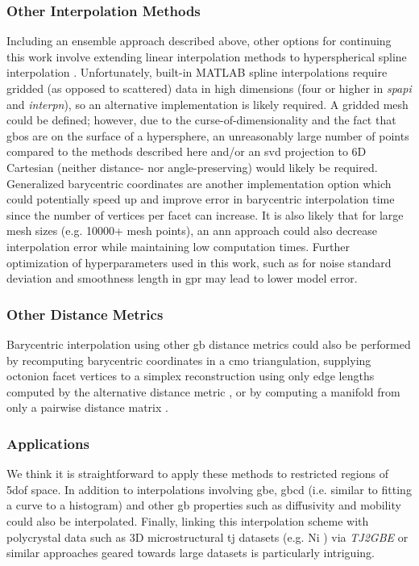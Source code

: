 \documentclass[preprint,12pt]{elsarticle}
\begin{document}
\subsubsection{Other Interpolation Methods}
Including an ensemble approach described above, other options for continuing this work involve extending linear interpolation methods to hyperspherical spline interpolation \cite{taijeronSplineInterpolationSmoothing1994}. Unfortunately, built-in MATLAB spline interpolations require gridded (as opposed to scattered) data in high dimensions (four or higher in \textit{spapi} and \textit{interpn}), so an alternative implementation is likely required. A gridded mesh could be defined; however, due to the curse-of-dimensionality and the fact that \glspl{gbo} are on the surface of a hypersphere, an unreasonably large number of points compared to the methods described here and/or an \gls{svd} projection to 6D Cartesian (neither distance- nor angle-preserving) would likely be required. Generalized barycentric coordinates \cite{floaterGeneralizedBarycentricCoordinates2015,meyerGeneralizedBarycentricCoordinates2002,langerSphericalBarycentricCoordinates2006} are another implementation option which could potentially speed up and improve error in barycentric interpolation time since the number of vertices per facet can increase. It is also likely that for large mesh sizes (e.g. \num{10000}+ mesh points), an \gls{ann} approach \cite{echeverrirestrepoUsingArtificialNeural2014} could also decrease interpolation error while maintaining low computation times. Further optimization of hyperparameters used in this work, such as for noise standard deviation and smoothness length in \gls{gpr} may lead to lower model error.

\subsubsection{Other  Distance Metrics}
Barycentric interpolation using other \gls{gb} distance metrics \cite{morawiecDistancesGrainInterfaces2019} could also be performed by recomputing barycentric coordinates in a \gls{cmo} triangulation, supplying octonion facet vertices to a simplex reconstruction using only edge lengths computed by the alternative distance metric \cite{connorHighdimensionalSimplexesSupermetric2017}, or by computing a manifold from only a pairwise distance matrix \cite{boissonnatOnlyDistancesAre2017}.

\subsubsection{Applications}
We think it is straightforward to apply these methods to restricted regions of \gls{5dof} space. In addition to interpolations involving \gls{gbe}, \gls{gbcd} (i.e. similar to fitting a curve to a histogram) and other \gls{gb} properties such as diffusivity and mobility could also be interpolated. Finally, linking this interpolation scheme with polycrystal data such as 3D microstructural \gls{tj} datasets (e.g. Ni \cite{liRelativeGrainBoundary2009}) via \textit{TJ2GBE} \cite{shenDeterminingGrainBoundary2019} or similar approaches geared towards large datasets is particularly intriguing.
\end{document}
